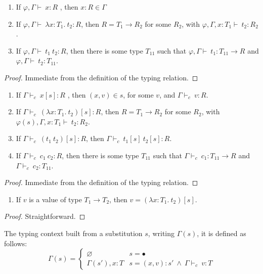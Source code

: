 \documentclass[preprint,authoryear,sort&compress,9pt,nocopyrightspace]{article}
\newcommand{\conf}[2][s]{(#2)[#1]}
\newcommand{\env}{{\emt,\Gamma \vdash \ }}
\newcommand{\envE}{{\emt, \Gamma , x:T_1 \vdash \ }}
\newcommand{\tyC}{{\Gamma \vdash_c \ }}
\newcommand{\envEC}{{\emt(s), \Gamma , x:T_1 \vdash \ }}
\newcommand{\absD}{\lambda x:T_1. \ t_2}
\newcommand{\emt}{\varphi}
\begin{document}
\begin{lemma}
\label{lemma:itt}
\mbox{}
\begin{enumerate}
\item If $\env x : R$ , then $x : R \in \Gamma$
\item If $\env \absD : R$, then $R = T_1 \to R_2$ for some $R_2$, with $\envE t_2 : R_2$.
\item If $\env t_1 \ t_2 : R$, then there is some type $T_{11}$ such that $\env t_1 : T_{11} \to R$ and $\env t_2 : T_{11}$.
\end{enumerate}
\end{lemma}
\begin{proof}
Immediate from the definition of the typing relation.
\end{proof}

\begin{lemma} 
\label{lemma:ict}
\mbox{}
\begin{enumerate}
\item If $\tyC x[s] : R$ , then $(x,v) \in s$, for some $v$, and $\tyC v:R$.
\item If $\tyC \conf{\absD}: R$, then $R = T_1 \to R_2$ for some $R_2$, with $\envEC t_2 : R_2$.
\item If $\tyC  \conf{t_1 \ t_2} : R$, then $\tyC  t_1 [s] \ t_2 [s]:R$.
\item If $\tyC   c_1 \ c_2 : R$, then there is some type $T_{11}$ such that $\tyC c_1 : T_{11} \to R$ and $\tyC c_2: T_{11}$.
\end{enumerate}
\end{lemma}

\begin{proof}Immediate from the definition of the typing relation.
\end{proof}

\begin{lemma} 
\label{lemma:cf}
\mbox{}
\begin{enumerate}
\item If $v$ is a value of type $T_1 \to T_2$, then $v = \conf{\absD}$.
\end{enumerate}
\end{lemma}

\begin{proof} Straightforward.
\end{proof}

\begin{definition}[$\Gamma(s)$]
\label{definition:tcs}
\mbox{}
The typing context built from a substitution $s$, writing $\Gamma(s)$, it is defined as follows:
\[ \Gamma(s) = \begin{cases} 
     \varnothing & s =  \bullet \\
      \Gamma(s'), x:T & s = (x,v):s' \ \land \ \tyC v : T 
   \end{cases}
\]
\end{definition}
\end{document}
